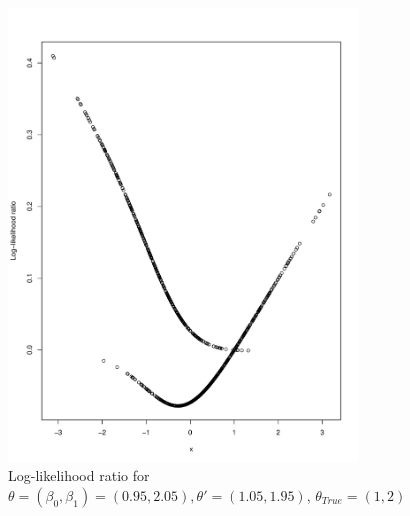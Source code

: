 \begin{figure}[H]
    \centering
    \includegraphics[scale = 0.7, height = 12cm]{figures/loglik_ratio_logistic.pdf}
    \caption{Log-likelihood ratio for $\theta = \left(\beta_0, \beta_1\right) = \left(0.95, 2.05\right), \theta' = \left(1.05, 1.95\right)$, $\theta_{True} = \left(1, 2\right)$}
    \label{fig:loglik_ratio_logistic}
\end{figure}{}
